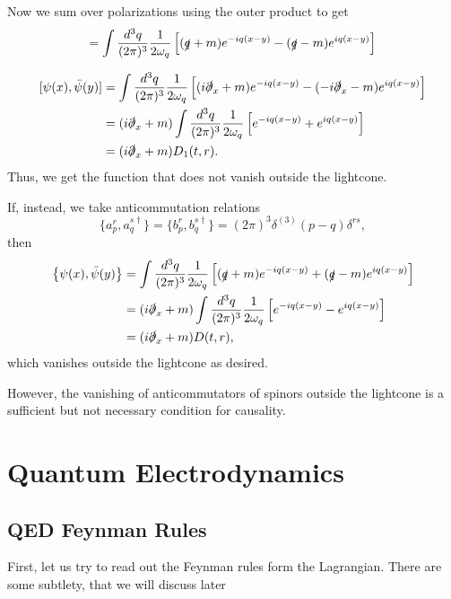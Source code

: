 \documentclass[11pt]{article}
\theoremstyle{definition}
\begin{document}
Now we sum over polarizations using the outer product to get
\begin{equation}
[\psi(x),\bar{\psi}(y)]=\int\frac{d^{3}q}{(2\pi)^{3}}\frac{1}{2\omega_{q}}\left[(\slashed{q}+m)e^{-iq(x-y)}-(\slashed{q}-m)e^{iq(x-y)}\right]
\end{equation}

\begin{equation}
\begin{aligned}
[\psi(x),\bar{\psi}(y)] &=\int\frac{d^{3}q}{(2\pi)^{3}}\frac{1}{2\omega_{q}}\left[(i\slashed{\partial}_{x}+m)e^{-iq(x-y)}-(-i\slashed{\partial}_{x}-m)e^{iq(x-y)}\right] \\
&=(i\slashed{\partial}_{x}+m)\int\frac{d^{3}q}{(2\pi)^{3}}\frac{1}{2\omega_{q}}\left[e^{-iq(x-y)}+e^{iq(x-y)}\right] \\
&=(i\slashed{\partial}_{x}+m)D_{1}(t,r).
\end{aligned}
\end{equation}
Thus, we get the function that does not vanish outside the lightcone.

If, instead, we take anticommutation relations
\begin{equation}
\{a_{p}^{r},a_{q}^{s\dagger}\}=\{b_{p}^{r},b_{q}^{s\dagger}\}=(2\pi)^{3}\delta^{(3)}(p-q)\delta^{rs},
\end{equation}
then
\begin{equation}
\begin{aligned}
\left\{\psi(x),\bar{\psi}(y)\right\} &=\int\frac{d^{3}q}{(2\pi)^{3}}\frac{1}{2\omega_{q}}\left[(\slashed{q}+m)e^{-iq(x-y)}+(\slashed{q}-m)e^{iq(x-y)}\right] \\
&=(i\slashed{\partial}_{x}+m)\int\frac{d^{3}q}{(2\pi)^{3}}\frac{1}{2\omega_{q}}\left[e^{-iq(x-y)}-e^{iq(x-y)}\right] \\
&=(i\slashed{\partial}_{x}+m)D(t,r),
\end{aligned}
\end{equation}
which vanishes outside the lightcone as desired.

However, the vanishing of anticommutators of spinors outside the lightcone is a sufficient but not necessary condition for causality.
\section{Quantum Electrodynamics}
\subsection{QED Feynman Rules}
First, let us try to read out the Feynman rules form the Lagrangian. There are some subtlety, that we will discuss later
\end{document}
